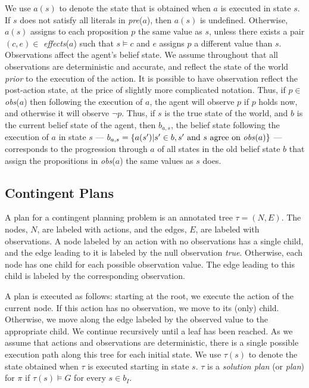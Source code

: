 \documentclass[letterpaper]{article}
\numberwithin{equation}{section}	%
\begin{document}
We use $a(s)$ to denote the state that is obtained when $a$ is executed in state $s$.
If $s$ does not satisfy all literals in \emph{pre}($a$), then $a(s)$ is undefined.
Otherwise, $a(s)$ assigns to each proposition $p$ the same value as $s$, unless there exists a pair $(c,e)\in $ \emph{effects}($a$) such that $s\models c$ and $e$ assigns  $p$ a different value than $s$.
Observations affect the agent's belief state.
We assume throughout that all observations are deterministic and accurate, and reflect the state of the world \emph{prior} to the execution of the action. It is possible to have observation reflect the post-action state, at the price of slightly more complicated notation.
Thus, if $p\in $\emph{obs}($a$) then following the execution of $a$, the agent will observe $p$ if $p$ holds now, and otherwise
it will observe $\neg p$.
Thus, if $s$ is the true state of the world, and $b$ is the current belief state of the agent,
then $b_{a,s}$, the belief state following the execution of $a$ in state $s$ ---  $b_{a,s} = \{a(s') | s'\in b , s' \mbox{ and }s \mbox{ agree on \emph{obs}}(a)\}$ ---
corresponds to the progression through $a$ of all states in the old belief state $b$ that
assign the propositions in \emph{obs}($a$) the same values as $s$ does.

\subsection{Contingent Plans}
A plan for a contingent planning problem is an annotated tree $\tau=(N,E)$. The nodes, $N$, are labeled with actions, and the
edges, $E$, are labeled with observations. A node labeled by an action with no observations has a single child, and the edge leading
to it is labeled by the null observation {\em true\/}. Otherwise, each node has one child for each possible observation value.
The edge leading to this child is labeled by the corresponding observation.

A plan is executed as follows: starting at the root, we execute the action of the current node. If this action has no observation, we move to its (only) child. Otherwise, we move along the edge labeled by the observed value to the appropriate child. We continue recursively until a leaf has been reached.
As we assume that actions and observations are deterministic, there is a single possible execution path along this tree for each initial state. We use $\tau(s)$ to denote the state obtained when $\tau$ is executed starting in state $s$.
$\tau$ is a \emph{solution plan} (or \emph{plan}) for $\pi$ if $\tau(s)\models G$ for every $s\in b_I$.
\end{document}
